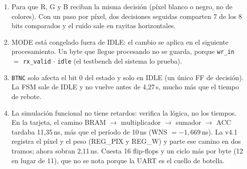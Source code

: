\documentclass[11pt,a4paper]{article}
\newcommand{\sig}[1]{\texttt{\color{azul}#1}}
\newcommand{\bus}[1]{\texttt{#1}}
\begin{document}
\begin{enumerate}
\item Para que R, G y B reciban la misma decisión (píxel blanco o negro, no de colores). Con un paso por píxel, dos decisiones seguidas comparten 7 de los 8 bits comparados y el ruido sale en rayitas horizontales.
\item MODE está congelado fuera de IDLE: el cambio se aplica en el siguiente procesamiento. Un byte que llegue procesando no se guarda, porque \sig{wr\_in} $=$ \sig{rx\_valid} $\cdot$ \sig{idle} (el testbench del sistema lo prueba).
\item \bus{BTNC} solo afecta el bit 0 del estado y solo en IDLE (un único FF de decisión). La FSM sale de IDLE y no vuelve antes de 4,27\,s, mucho más que el tiempo de rebote.
\item La simulación funcional no tiene retardos: verifica la lógica, no los tiempos. En la tarjeta, el camino BRAM $\to$ multiplicador $\to$ sumador $\to$ ACC tardaba 11,35\,ns, más que el período de 10\,ns (WNS $= -1{,}669$\,ns). La v4.1 registra el píxel y el peso (REG\_PIX y REG\_W) y parte ese camino en dos tramos; ahora sobran 2,11\,ns. Cuesta 16 flip-flops y un ciclo más por byte (12 en lugar de 11), que no se nota porque la UART es el cuello de botella.
\end{enumerate}
\end{document}
